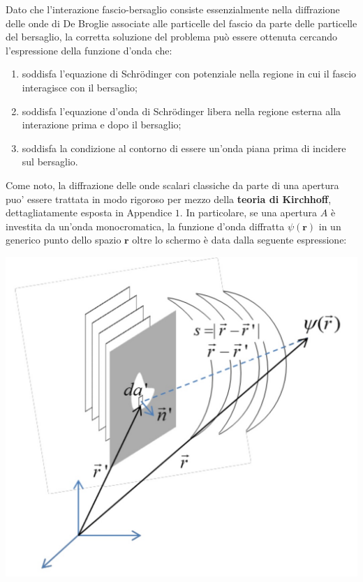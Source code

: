 Dato che l'interazione fascio-bersaglio consiste essenzialmente nella
diffrazione delle onde di De Broglie associate alle particelle del
fascio da parte delle particelle del bersaglio, la corretta soluzione
del problema può essere ottenuta cercando l'espressione della funzione
d'onda che:
\begin{enumerate}
	\tightlist
	\item
	soddisfa l'equazione di Schrödinger con potenziale nella regione in
	cui il fascio interagisce con il bersaglio;
	\item
	soddisfa l'equazione d'onda di Schrödinger libera nella regione
	esterna alla interazione prima e dopo il bersaglio;
	\item
	soddisfa la condizione al contorno di essere un'onda piana prima di
	incidere sul bersaglio.
\end{enumerate}
Come noto, la diffrazione delle onde scalari classiche da parte di una
apertura puo' essere trattata in modo rigoroso per mezzo della
\textbf{teoria di Kirchhoff}, dettagliatamente esposta in Appendice
\(1\).
In particolare, se una apertura \(A\) è investita da un'onda
monocromatica, la funzione d'onda diffratta \(\psi(\bm{r})\) in un
generico punto dello spazio \(\bm{r}\) oltre lo schermo è data dalla
seguente espressione:
\begin{marginfigure}
	\includegraphics[width = 1.25 \textwidth, height = 1.25 \textheight]{figs/kirchhoff-diffraction-1}
	\label{fig:kirchhoff-1}
\end{marginfigure}

